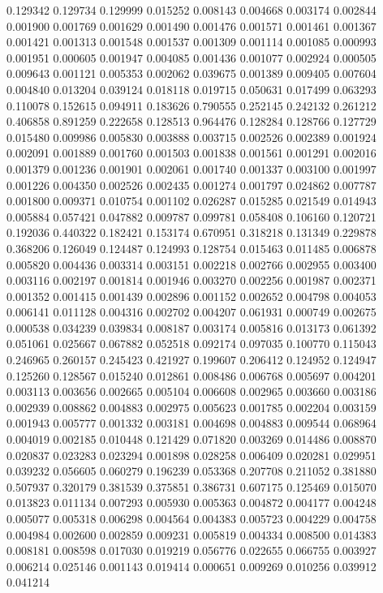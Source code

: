 0.129342
0.129734
0.129999
0.015252
0.008143
0.004668
0.003174
0.002844
0.001900
0.001769
0.001629
0.001490
0.001476
0.001571
0.001461
0.001367
0.001421
0.001313
0.001548
0.001537
0.001309
0.001114
0.001085
0.000993
0.001951
0.000605
0.001947
0.004085
0.001436
0.001077
0.002924
0.000505
0.009643
0.001121
0.005353
0.002062
0.039675
0.001389
0.009405
0.007604
0.004840
0.013204
0.039124
0.018118
0.019715
0.050631
0.017499
0.063293
0.110078
0.152615
0.094911
0.183626
0.790555
0.252145
0.242132
0.261212
0.406858
0.891259
0.222658
0.128513
0.964476
0.128284
0.128766
0.127729
0.015480
0.009986
0.005830
0.003888
0.003715
0.002526
0.002389
0.001924
0.002091
0.001889
0.001760
0.001503
0.001838
0.001561
0.001291
0.002016
0.001379
0.001236
0.001901
0.002061
0.001740
0.001337
0.003100
0.001997
0.001226
0.004350
0.002526
0.002435
0.001274
0.001797
0.024862
0.007787
0.001800
0.009371
0.010754
0.001102
0.026287
0.015285
0.021549
0.014943
0.005884
0.057421
0.047882
0.009787
0.099781
0.058408
0.106160
0.120721
0.192036
0.440322
0.182421
0.153174
0.670951
0.318218
0.131349
0.229878
0.368206
0.126049
0.124487
0.124993
0.128754
0.015463
0.011485
0.006878
0.005820
0.004436
0.003314
0.003151
0.002218
0.002766
0.002955
0.003400
0.003116
0.002197
0.001814
0.001946
0.003270
0.002256
0.001987
0.002371
0.001352
0.001415
0.001439
0.002896
0.001152
0.002652
0.004798
0.004053
0.006141
0.011128
0.004316
0.002702
0.004207
0.061931
0.000749
0.002675
0.000538
0.034239
0.039834
0.008187
0.003174
0.005816
0.013173
0.061392
0.051061
0.025667
0.067882
0.052518
0.092174
0.097035
0.100770
0.115043
0.246965
0.260157
0.245423
0.421927
0.199607
0.206412
0.124952
0.124947
0.125260
0.128567
0.015240
0.012861
0.008486
0.006768
0.005697
0.004201
0.003113
0.003656
0.002665
0.005104
0.006608
0.002965
0.003660
0.003186
0.002939
0.008862
0.004883
0.002975
0.005623
0.001785
0.002204
0.003159
0.001943
0.005777
0.001332
0.003181
0.004698
0.004883
0.009544
0.068964
0.004019
0.002185
0.010448
0.121429
0.071820
0.003269
0.014486
0.008870
0.020837
0.023283
0.023294
0.001898
0.028258
0.006409
0.020281
0.029951
0.039232
0.056605
0.060279
0.196239
0.053368
0.207708
0.211052
0.381880
0.507937
0.320179
0.381539
0.375851
0.386731
0.607175
0.125469
0.015070
0.013823
0.011134
0.007293
0.005930
0.005363
0.004872
0.004177
0.004248
0.005077
0.005318
0.006298
0.004564
0.004383
0.005723
0.004229
0.004758
0.004984
0.002600
0.002859
0.009231
0.005819
0.004334
0.008500
0.014383
0.008181
0.008598
0.017030
0.019219
0.056776
0.022655
0.066755
0.003927
0.006214
0.025146
0.001143
0.019414
0.000651
0.009269
0.010256
0.039912
0.041214
